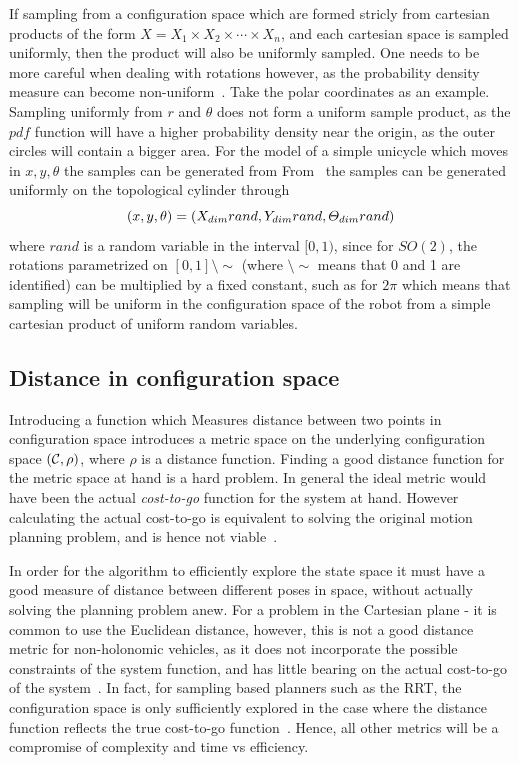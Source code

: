 If sampling from a configuration space which are formed stricly from cartesian
products of the form \(X = X_1\times X_2\times \cdots \times X_n\), and each cartesian
space is sampled uniformly, then the product will also be uniformly sampled. One
needs to be more careful when dealing with rotations however, as the probability
density measure can become non-uniform~\cite{Lav06}. Take the polar coordinates
as an example. Sampling uniformly from \(r\) and \(\theta\) does not form a
uniform sample product, as the \(pdf\) function will have a higher probability
density near the origin, as the outer circles will contain a bigger area. For
the model of a simple unicycle which moves in \(x,y,\theta\) the samples can be
generated from From~\cite{kuffnerEffectiveSamplingDistance2004} the samples can
be generated uniformly on the topological cylinder through
\[
  (x,y,\theta) = (\mathnormal{X}_{dim}rand, \mathnormal{Y}_{dim}rand, \mathnormal{\Theta}_{dim}rand)
\]
where \(rand\) is a random variable in the interval \([0,1)\), since for
\(SO(2)\), the rotations parametrized on \([0,1]\setminus\sim\) (where
\(\setminus\sim\) means that 0 and 1 are identified) can be multiplied by a
fixed constant, such as for \(2\pi\) which means that sampling will be uniform
in the configuration space of the robot from a simple cartesian product of
uniform random variables.

\subsection{Distance in configuration space}

Introducing a function which Measures distance between two points in
configuration space introduces a metric space on the underlying configuration
space \((\mathcal{C}{},\rho)\), where \(\rho\) is a distance
function. Finding a good distance function for the metric space at hand is a
hard problem. In general the ideal metric would have been the actual
\textit{cost-to-go} function for the system at hand. However calculating the
actual cost-to-go is equivalent to solving the original motion planning problem,
and is hence not viable~\cite{pengchengReducingMetricSensitivity2001}.

In order for the \rrtfunnel{} algorithm to efficiently explore the state space
it must have a good measure of distance between different poses in space,
without actually solving the planning problem anew. For a problem in the
Cartesian plane - it is common to use the Euclidean distance, however, this is
not a good distance metric for non-holonomic vehicles, as it does not
incorporate the possible constraints of the system function, and has little
bearing on the actual cost-to-go of the
system~\cite{parkFeedbackMotionPlanning2015}. In fact, for sampling based
planners such as the \ac{RRT}, the configuration space is only sufficiently
explored in the case where the distance function reflects the true cost-to-go
function~\cite{pengchengReducingMetricSensitivity2001}. Hence, all other metrics
will be a compromise of complexity and time vs efficiency.


